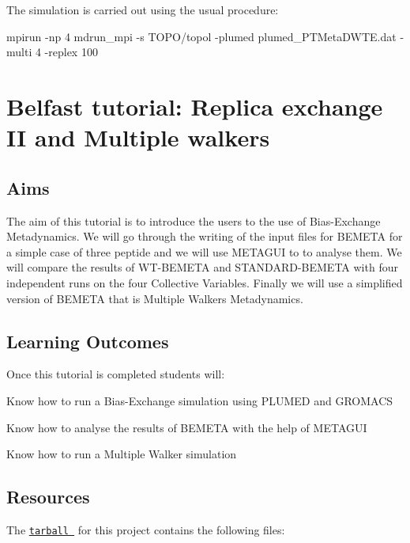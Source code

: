 The simulation is carried out using the usual procedure\+:

\begin{DoxyVerb} mpirun -np 4 mdrun_mpi -s TOPO/topol -plumed plumed_PTMetaDWTE.dat -multi 4 -replex 100
\end{DoxyVerb}
 \hypertarget{belfast-8}{}\section{Belfast tutorial\+: Replica exchange I\+I and Multiple walkers}\label{belfast-8}
\hypertarget{belfast-10_Aims}{}\subsection{Aims}\label{belfast-10_Aims}
The aim of this tutorial is to introduce the users to the use of Bias-\/\+Exchange Metadynamics. We will go through the writing of the input files for B\+E\+M\+E\+T\+A for a simple case of three peptide and we will use M\+E\+T\+A\+G\+U\+I to to analyse them. We will compare the results of W\+T-\/\+B\+E\+M\+E\+T\+A and S\+T\+A\+N\+D\+A\+R\+D-\/\+B\+E\+M\+E\+T\+A with four independent runs on the four Collective Variables. Finally we will use a simplified version of B\+E\+M\+E\+T\+A that is Multiple Walkers Metadynamics.\hypertarget{belfast-8_belfast-8-lo}{}\subsection{Learning Outcomes}\label{belfast-8_belfast-8-lo}
Once this tutorial is completed students will\+:


\begin{DoxyItemize}
\item Know how to run a Bias-\/\+Exchange simulation using P\+L\+U\+M\+E\+D and G\+R\+O\+M\+A\+C\+S
\item Know how to analyse the results of B\+E\+M\+E\+T\+A with the help of M\+E\+T\+A\+G\+U\+I
\item Know how to run a Multiple Walker simulation
\end{DoxyItemize}\hypertarget{belfast-10_Resources}{}\subsection{Resources}\label{belfast-10_Resources}
The \href{tutorial-resources/belfast-8.tgz}{\tt tarball } for this project contains the following files\+:


